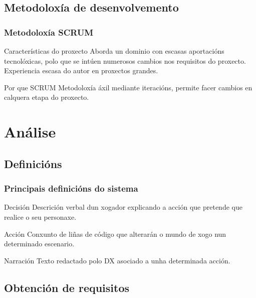 \documentclass[12pt]{beamer}
\begin{document}
\subsection{Metodoloxía de desenvolvemento}
\begin{frame}
\frametitle{Metodoloxía SCRUM}
\begin{block}{Características do proxecto}
Aborda un dominio con escasas aportacións tecnolóxicas, polo que se intúen
numerosos cambios nos requisitos do proxecto. Experiencia escasa do autor en
proxectos grandes.
\end{block}
\begin{block}{Por que SCRUM}
Metodoloxía áxil mediante iteracións, permite facer cambios en calquera etapa do
proxecto.
\end{block}
\end{frame}

\section{Análise}

\subsection{Definicións}
\begin{frame}
\frametitle{Principais definicións do sistema}
\begin{block}{Decisión}
Descrición verbal dun xogador explicando a acción que pretende que realice
o seu personaxe.
\end{block}

\begin{block}{Acción}
Conxunto de liñas de código que alterarán o mundo de xogo nun determinado
escenario.
\end{block}

\begin{block}{Narración}
Texto redactado polo DX asociado a unha determinada acción.
\end{block}
\end{frame}

\subsection{Obtención de requisitos}
\end{document}
